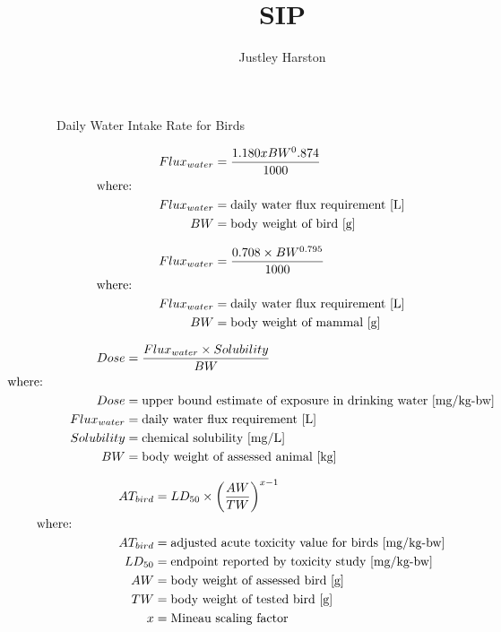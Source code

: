 \documentclass[12pt, A4]{article}
\begin{document}
\title{SIP}

\author{Justley Harston}


\maketitle


Daily Water Intake Rate for Birds

\begin{align}
Flux_{water} & = \frac{1.180 x BW^0.874}{1000} \nonumber \\
&    \hspace{-1.3in}  \text{where:} \nonumber \\
Flux_{water} & = \text{daily water flux requirement [L]} \nonumber \\
BW & = \text{body weight of bird [g]}  \nonumber \\
\end{align} 

\begin{align}
Flux_{water} & = \frac{0.708 \times BW^{0.795}}{1000} \nonumber \\
&    \hspace{-1.3in}  \text{where:} \nonumber \\
Flux_{water} & = \text{daily water flux requirement [L]} \nonumber \\
BW & = \text{body weight of mammal [g]}  \nonumber  
\end{align}  

\begin{align}
Dose & = \frac{Flux_{water} \times Solubility}{BW} \nonumber \\
&    \hspace{-1.3in}  \text{where:} \nonumber \\
Dose & =\text{upper bound estimate of exposure in drinking water [mg/kg-bw]} \nonumber \\
Flux_{water} & = \text{daily water flux requirement [L]} \nonumber \\
Solubility & = \text{chemical solubility [mg/L]} \nonumber \\
BW & = \text{body weight of assessed animal [kg]}  \nonumber  
\end{align}  
 
 \begin{align}
AT_{bird} & = LD_{50} \times \left (\frac{AW}{TW} \right )^{x-1} \nonumber \\
&    \hspace{-1.3in}  \text{where:} \nonumber \\
AT_{bird} & = \text{adjusted acute toxicity value for birds [mg/kg-bw]} \nonumber \\
LD_{50} & =\text{endpoint reported by toxicity study [mg/kg-bw]} \nonumber \\
AW & = \text{body weight of assessed bird [g]} \nonumber \\
TW & = \text{body weight of tested bird [g]} \nonumber \\
x & = \text{Mineau scaling factor} \nonumber
\end{align}  
\end{document}
